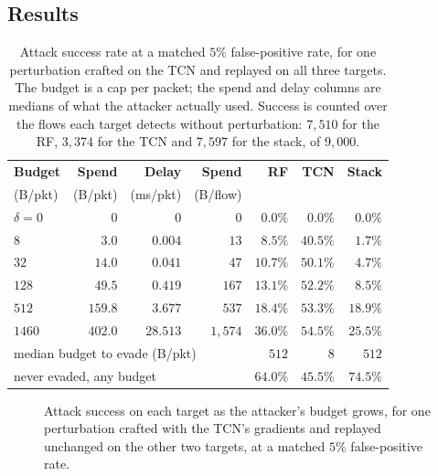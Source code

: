 \subsection{Results}\label{subsec:eval-gradablation-results}

\begin{table}[htbp]
    \centering
    \caption[Evasion cost under a gradient-guided attacker.]{Attack success rate at a
    matched $5\%$ false-positive rate, for one perturbation crafted on the TCN and
    replayed on all three targets. The budget is a cap per packet; the spend and delay
    columns are medians of what the attacker actually used. Success is counted over the
    flows each target detects without perturbation: $7{,}510$ for the RF, $3{,}374$ for
    the TCN and $7{,}597$ for the stack, of $9{,}000$.}
    \label{tab:eval-gradablation}
    \begin{tabular}{lrrrrrr}
        \toprule
        \textbf{Budget} & \textbf{Spend} & \textbf{Delay} & \textbf{Spend} &
        \textbf{RF} & \textbf{TCN} & \textbf{Stack} \\
        (B/pkt) & (B/pkt) & (ms/pkt) & (B/flow) & & & \\
        \midrule
        $\delta = 0$ & $0$     & $0$      & $0$     & $0.0\%$  & $0.0\%$  & $0.0\%$ \\
        $8$          & $3.0$   & $0.004$  & $13$    & $8.5\%$  & $40.5\%$ & $\mathbf{1.7\%}$ \\
        $32$         & $14.0$  & $0.041$  & $47$    & $10.7\%$ & $50.1\%$ & $\mathbf{4.7\%}$ \\
        $128$        & $49.5$  & $0.419$  & $167$   & $13.1\%$ & $52.2\%$ & $\mathbf{8.5\%}$ \\
        $512$        & $159.8$ & $3.677$  & $537$   & $\mathbf{18.4\%}$ & $53.3\%$ & $18.9\%$ \\
        $1460$       & $402.0$ & $28.513$ & $1{,}574$ & $36.0\%$ & $54.5\%$ & $\mathbf{25.5\%}$ \\
        \midrule
        \multicolumn{4}{l}{median budget to evade (B/pkt)} & $512$ & $8$ & $512$ \\
        \multicolumn{4}{l}{never evaded, any budget} & $64.0\%$ & $45.5\%$ & $\mathbf{74.5\%}$ \\
        \bottomrule
    \end{tabular}
\end{table}

\begin{figure}[htbp]
    \centering
    
    \caption[Evasion cost: one perturbation, three targets.]{Attack success on each
    target as the attacker's budget grows, for one perturbation crafted with the TCN's
    gradients and replayed unchanged on the other two targets, at a matched $5\%$
    false-positive rate.}
    \label{fig:eval-evasioncost}
\end{figure}

